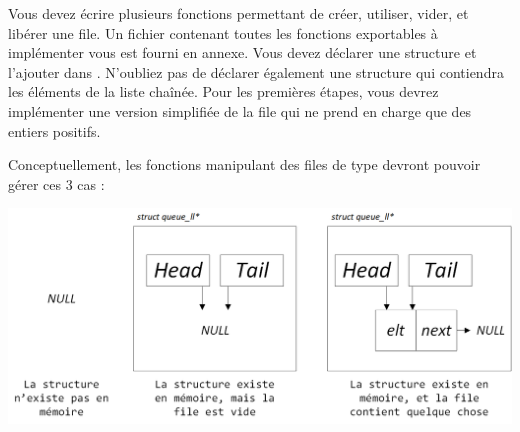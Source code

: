 

\vspace*{0.7cm}

\noindent {}

\bigskip

%

\noindent Vous devez écrire plusieurs fonctions permettant de créer, utiliser, vider, et libérer une file.
Un fichier  contenant toutes les fonctions exportables à implémenter vous est fourni en annexe.
Vous devez déclarer une structure  et l'ajouter dans .
N'oubliez pas de déclarer également une structure qui contiendra les éléments de la liste chaînée.
Pour les premières étapes, vous devrez implémenter une version simplifiée de la file qui ne prend en charge que des entiers positifs.

\bigskip

\noindent Conceptuellement, les fonctions manipulant des files de type  devront pouvoir gérer ces 3 cas :

\bigskip

\begin{center}
\includegraphics[scale=0.85]{Cours/Files_Implementation_LL.png}
\end{center}


